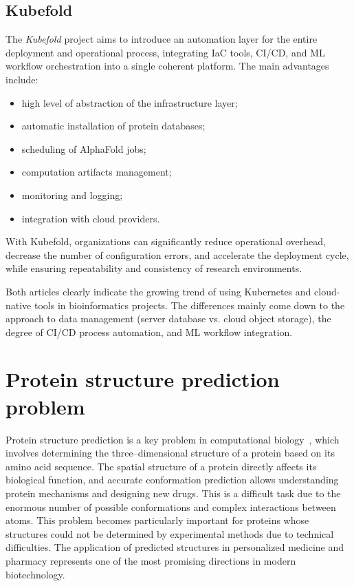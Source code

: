\subsection{Kubefold}

The \textit{Kubefold} project aims to introduce an automation layer for the entire deployment and operational process, integrating IaC tools, CI/CD, and ML workflow orchestration into a single coherent platform.
The main advantages include:
\begin{itemize}
    \item high level of abstraction of the infrastructure layer;
    \item automatic installation of protein databases;
    \item scheduling of AlphaFold jobs;
    \item computation artifacts management;
    \item monitoring and logging;
    \item integration with cloud providers.
\end{itemize}
With Kubefold, organizations can significantly reduce operational overhead, decrease the number of configuration errors, and accelerate the deployment cycle, while ensuring repeatability and consistency of research environments.

\bigskip
Both articles clearly indicate the growing trend of using Kubernetes and cloud-native tools in bioinformatics projects.
The differences mainly come down to the approach to data management (server database vs. cloud object storage), the degree of CI/CD process automation, and ML workflow integration.


\section{Protein structure prediction problem}
Protein structure prediction is a key problem in computational biology~\cite{alphafold3}, which involves determining the three--dimensional structure of a protein based on its amino acid sequence.
The spatial structure of a protein directly affects its biological function, and accurate conformation prediction allows understanding protein mechanisms and designing new drugs.
This is a difficult task due to the enormous number of possible conformations and complex interactions between atoms.
This problem becomes particularly important for proteins whose structures could not be determined by experimental methods due to technical difficulties.
The application of predicted structures in personalized medicine and pharmacy represents one of the most promising directions in modern biotechnology.


